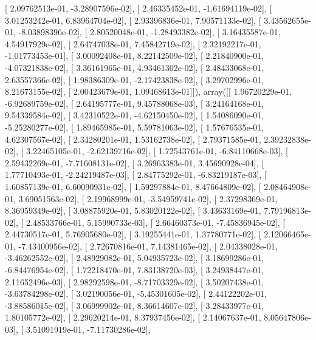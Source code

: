 \documentclass{article}
\begin{document}
       [  2.09762513e-01,  -3.28907596e-02],
       [  2.46335452e-01,  -1.61694119e-02],
       [  3.01253242e-01,   6.83964704e-02],
       [  2.93396836e-01,   7.90571133e-02],
       [  3.43562655e-01,  -8.03898396e-02],
       [  2.80520048e-01,  -1.28493382e-02],
       [  3.16435587e-01,   4.54917929e-02],
       [  2.64747038e-01,   7.45842719e-02],
       [  2.32192217e-01,  -1.01773453e-01],
       [  3.00092408e-01,   8.22142509e-02],
       [  2.21840900e-01,  -4.07321838e-02],
       [  3.36161965e-01,   4.93461302e-02],
       [  2.48433068e-01,   2.63557366e-02],
       [  1.98386309e-01,  -2.17423838e-02],
       [  3.29702996e-01,   8.21673155e-02],
       [  2.00423679e-01,   1.09468613e-01]]), array([[  1.96720229e-01,  -6.92689759e-02],
       [  2.64195777e-01,   9.45788068e-03],
       [  3.24164168e-01,   9.54339584e-02],
       [  3.42310522e-01,  -4.62150450e-02],
       [  1.54086090e-01,  -5.25280277e-02],
       [  1.89465985e-01,   5.59781063e-02],
       [  1.57676535e-01,   4.62307567e-02],
       [  2.34280201e-01,   1.53162738e-02],
       [  2.79371585e-01,   2.39232838e-02],
       [  3.22465105e-01,  -2.62139716e-02],
       [  1.72543761e-01,  -6.84110668e-03],
       [  2.59432269e-01,  -7.71608131e-02],
       [  3.26963383e-01,   3.45690928e-04],
       [  1.77710493e-01,  -2.24219487e-03],
       [  2.84775292e-01,  -6.83219187e-03],
       [  1.60857139e-01,   6.60090931e-02],
       [  1.59297884e-01,   8.47664809e-02],
       [  2.08464908e-01,   3.69051563e-02],
       [  2.19968999e-01,  -3.54959741e-02],
       [  2.37298369e-01,   8.36959349e-02],
       [  3.08875920e-01,   5.83020122e-02],
       [  3.43633169e-01,   7.79196813e-02],
       [  2.48533766e-01,   5.15990733e-03],
       [  2.66460373e-01,  -7.45836945e-02],
       [  2.44730517e-01,   5.76905680e-02],
       [  3.19255441e-01,   1.37780771e-02],
       [  2.12066465e-01,  -7.43400956e-02],
       [  2.72670816e-01,   7.14381465e-02],
       [  2.04338028e-01,  -3.46262552e-02],
       [  2.48929082e-01,   5.04935723e-02],
       [  3.18699286e-01,  -6.84476954e-02],
       [  1.72218470e-01,   7.83138720e-03],
       [  3.24938447e-01,   2.11652496e-03],
       [  2.98292598e-01,  -8.71703329e-02],
       [  3.50207438e-01,  -3.63784298e-02],
       [  3.02190056e-01,  -5.45301605e-02],
       [  2.44122202e-01,  -3.88586015e-02],
       [  3.06999902e-01,   8.36614607e-02],
       [  3.28433977e-01,   1.80105772e-02],
       [  2.29620214e-01,   8.37937456e-02],
       [  2.14067637e-01,   8.05647806e-03],
       [  3.51091919e-01,  -7.11730286e-02],
\end{document}
